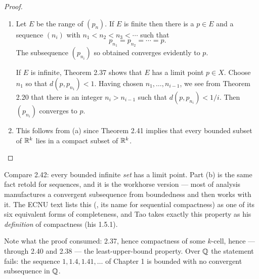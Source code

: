 \begin{proof}
\begin{enumerate}[label=(\alph*), leftmargin=2.2em, itemsep=4pt, topsep=3pt]
  \item Let $E$ be the range of $(p_n)$. If $E$ is finite then there is a
        $p \in E$ and a sequence $(n_i)$ with $n_1 < n_2 < n_3 < \cdots$ such
        that
        \[ p_{n_1} = p_{n_2} = \cdots = p. \]
        The subsequence $(p_{n_i})$ so obtained converges evidently to
        $p$.

        If $E$ is infinite, Theorem 2.37 shows that $E$ has a limit point
        $p \in X$. Choose $n_1$ so that $d(p,p_{n_1}) < 1$. Having chosen
        $n_1,\dots,n_{i-1}$, we see from Theorem 2.20 that there is an integer
        $n_i > n_{i-1}$ such that $d(p,p_{n_i}) < 1/i$. Then $(p_{n_i})$
        converges to $p$.
  \item This follows from (a) since Theorem 2.41 implies that every bounded
        subset of $\mathbb{R}^k$ lies in a compact subset of $\mathbb{R}^k$.
\end{enumerate}
\end{proof}

\begin{deeper}
Compare 2.42: every bounded infinite \emph{set} has a limit point. Part (b) is
the same fact retold for sequences, and it is the workhorse version --- most of
analysis manufactures a convergent subsequence from boundedness and then works
with it. The ECNU text lists this (, its
name for sequential compactness) as one of its six equivalent forms of
completeness, and Tao takes
exactly this property as his \emph{definition} of compactness (his 1.5.1).

Note what the proof consumed: 2.37, hence compactness of some $k$-cell, hence
--- through 2.40 and 2.38 --- the least-upper-bound property. Over $\mathbb{Q}$ the
statement fails: the sequence $1, 1.4, 1.41, \dots$ of Chapter 1 is bounded
with no convergent subsequence in $\mathbb{Q}$.
\end{deeper}

